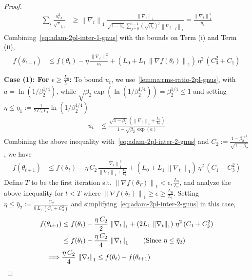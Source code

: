 \documentclass{article}
\newcommand{\ti}[1]{#1_{t,i}}
\newcommand{\normsq}[1]{\left\|#1 \right\|^{2}}
\newcommand{\norm}[1]{\left\|#1 \right\|}
\newcommand{\tht}{\theta_t}
\newcommand{\thtt}{\theta_{t+1}}
\begin{document}
\begin{proof}
\begin{align}
\sum_i \frac{\ti{g^2}}{\ti{\sqrt{v}}} & \geq \norm{\nabla_t}_1 \, \frac{\norm{\nabla_t}_1}{\sqrt{1 - \beta_2} \, \sum_{j = 0}^{t-1} (\sqrt{\beta_2})^{j} \, \norm{\nabla_{t-j}}_1} = \frac{\normsq{\nabla_t}_1}{u_t} \label{eq:adam-1pl-secondterm-gnus} 
\end{align}
Combining~\cref{eq:adam-2pl-inter-1-gnus} with the bounds on Term (i) and Term (ii), 
\begin{align}
f(\thtt) & \leq f(\tht) - \eta \,  \frac{\normsq{\nabla_t}_1}{u_t} +  \left(L_0 + L_1 \, \norm{\nabla f(\tht)}_1 \right) \, \eta^2 \, (C^2_3 + C_1)
\label{eq:adam-2pl-inter-2-gnus}
\end{align}

\textbf{Case (1): For $\epsilon \geq \frac{L_0}{L_1}$:} 
To bound $u_t$, we use~\cref{lemma:rms-ratio-2pl-gnus}, with $a = \ln(1/ \beta_2^{1/4})$, while $\sqrt{\beta_2} \exp( \ln(1/\beta_2^{1/4})) =\beta_2^{1/4}\leq 1$ and setting $\eta \leq \bar{\eta}_1 := \frac{1}{2 \, C_3 \, L_1}\ln(1/\beta_2^{1/4})$ 
\begin{align}
u_t & \leq \frac{\sqrt{1 - \beta_2} \; (\norm{\nabla_{t}}_1 + \frac{L_0}{L_1})}{1 - \sqrt{\beta_2} \, \exp(a)}
\end{align}
Combining the above inequality with~\cref{eq:adam-2pl-inter-2-gnus} and $C_2 := \frac{1-\beta_2^{1/4}}{ \sqrt{1 - \beta_2}}$, we have 
\begin{align}
    f(\thtt) & \leq f(\tht) - \eta \, C_2 \, \frac{\norm{\nabla_t}^2_1}{\norm{\nabla_t}_1 + \frac{L_0}{L_1}} +  \left(L_0 + L_1 \, \norm{\nabla_t}_1 \right) \, \eta^2 \,(C_1+ C^2_3) \label{eq:adam-2pl-inter-2half-gnus} 
\end{align}
Define $T$ to be the first iteration s.t. $\norm{\nabla f(\theta_{T})}_1 < \epsilon, \frac{L_0}{L_1}$, and analyze the above inequality for $t < T$ where $\norm{\nabla f(\theta_t)}_1 \geq \epsilon \geq \frac{L_0}{L_1}$. Setting $\eta \leq \bar{\eta}_2 := \frac{C_2}{8\, L_1\,(C_1+C_3^2)}$ and simplifying~\cref{eq:adam-2pl-inter-2-gnus} in this case, 
\begin{align}
f(\thtt) & \leq f(\tht) - \frac{\eta \, C_2}{2} \, \norm{\nabla_t}_1 +  \left(2 L_1 \, \norm{\nabla_t}_1 \right) \, \eta^2 \,(C_1+ C^2_3) \nonumber \\
& \leq f(\tht) - \frac{\eta \, C_2}{4} \, \norm{\nabla_t}_1 \tag{Since $\eta \leq \bar{\eta}_2$} \nonumber \\
\implies & \frac{\eta \, C_2}{4} \, \norm{\nabla_t}_1 \leq f(\tht) - f(\thtt) 
\label{eq:adam-2pl-inter-3-gnus}

\end{align}
\end{proof}
\end{document}
